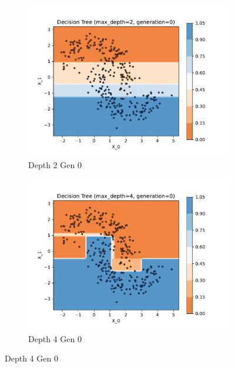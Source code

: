 \documentclass[acmconf,nonacm=true]{acmart}
\begin{document}
\begin{enumerate}
\begin{enumerate}
        \begin{figure}[H]
            \centering
            \begin{subfigure}[b]{0.5\textwidth}
                \includegraphics[width=\textwidth]{dt_depth_2_gen_0.pdf}
                \caption{Depth 2 Gen 0}
                \label{fig:dt_depth_2_gen_0}
            \end{subfigure}%
            \begin{subfigure}[b]{0.5\textwidth}
                \includegraphics[width=\textwidth]{dt_depth_4_gen_0.pdf}
                \caption{Depth 4 Gen 0}
                \label{fig:dt_depth_4_gen_0}
            \end{subfigure}
            \label{fig:1.1_row_2}
        \end{figure}


\end{enumerate}
\end{enumerate}
\end{document}
